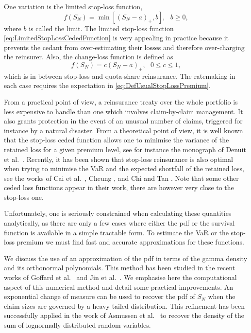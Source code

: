 One variation is the limited stop-loss function,
\begin{equation}\label{eq:LimitedStopLossCededFunction}
f(S_N)=\min[(S_N-a)_{+},b],\text{ }b\geq0,
\end{equation}
where $b$ is called the limit. The limited stop-loss function \eqref{eq:LimitedStopLossCededFunction} is very appealing in practice because it prevents the cedant from over-estimating their losses and therefore over-charging the reinsurer.
Also, the change-loss function is defined as
\begin{equation*}\label{eq:ChangeLossCededFunction}
f(S_N)=c(S_N-a)_{+},\text{ }0\leq c\leq1,
\end{equation*}
which is in between stop-loss and quota-share reinsurance. The ratemaking in each case requires the expectation in \eqref{eq:DefUsualStopLossPremium}.


From a practical point of view, a reinsurance treaty over the whole portfolio is less expensive to handle than one which involves claim-by-claim management. It also grants protection in the event of an unusual number of claims, triggered for instance by a natural disaster. From a theoretical point of view, it is well known that the stop-loss ceded function allows one to minimise the variance of the retained loss for a given premium level, see for instance the monograph of Denuit et al.\ \cite{DeDhGoKa06}. Recently, it has been shown that stop-loss reinsurance is also optimal when trying to minimise the VaR and the expected shortfall of the retained loss, see the works of Cai et al.\ \cite{CaTaWeZh08}, Cheung \cite{Ch10}, and Chi and Tan \cite{ChTa11}. Note that some other ceded loss functions appear in their work, there are however very close to the stop-loss one.

Unfortunately, one is seriously constrained when calculating these quantities analytically, as there are only a few cases where either the pdf or the survival function is available in a simple tractable form. To estimate the VaR or the stop-loss premium we must find fast and accurate approximations for these functions.

We discuss the use of an approximation of the pdf in terms of the gamma density and its orthonormal polynomials. This method has been studied in the recent works of Goffard et al.\ \cite{GoLoPo15} and Jin et al.\ \cite{JiPrRe16}. We emphasise here the computational aspect of this numerical method and detail some practical improvements. An exponential change of measure can be used to recover the pdf of $S_N$ when the claim sizes are governed by a heavy-tailed distribution. This refinement has been successfully applied in the work of Asmussen et al.\ \cite{asmussen2016orthonormal} to recover the density of the sum of lognormally distributed random variables.

